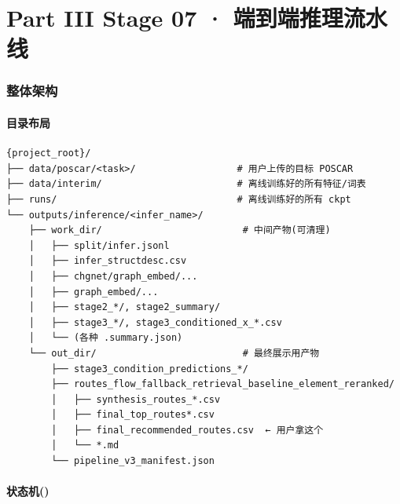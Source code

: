 \part*{Part III \quad Stage 07 · 端到端推理流水线}

\setcounter{section}{0}

\section{整体架构}

\subsection{目录布局}

\begin{lstlisting}
{project_root}/
├── data/poscar/<task>/                  # 用户上传的目标 POSCAR
├── data/interim/                        # 离线训练好的所有特征/词表
├── runs/                                # 离线训练好的所有 ckpt
└── outputs/inference/<infer_name>/
    ├── work_dir/                         # 中间产物(可清理)
    │   ├── split/infer.jsonl
    │   ├── infer_structdesc.csv
    │   ├── chgnet/graph_embed/...
    │   ├── graph_embed/...
    │   ├── stage2_*/, stage2_summary/
    │   ├── stage3_*/, stage3_conditioned_x_*.csv
    │   └── (各种 .summary.json)
    └── out_dir/                          # 最终展示用产物
        ├── stage3_condition_predictions_*/
        ├── routes_flow_fallback_retrieval_baseline_element_reranked/
        │   ├── synthesis_routes_*.csv
        │   ├── final_top_routes*.csv
        │   ├── final_recommended_routes.csv  ← 用户拿这个
        │   └── *.md
        └── pipeline_v3_manifest.json
\end{lstlisting}

\subsection{状态机()}

